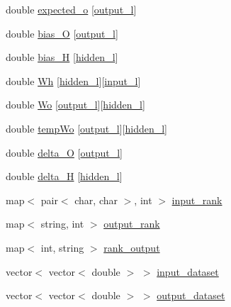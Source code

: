 \begin{DoxyCompactItemize}
\item 
double \hyperlink{a00003_a8d632cf69d2fcd076e473aba1ae74702}{expected\-\_\-o} \mbox{[}\hyperlink{a00008_a0a0ddfc9fb3bc3d90d175ed1f7bd54c5}{output\-\_\-l}\mbox{]}
\item 
double \hyperlink{a00003_a8f26363ac0ccda6f04df35e68164cd3a}{bias\-\_\-\-O} \mbox{[}\hyperlink{a00008_a0a0ddfc9fb3bc3d90d175ed1f7bd54c5}{output\-\_\-l}\mbox{]}
\item 
double \hyperlink{a00003_a38808438a02d406a7ab54c8bf825752a}{bias\-\_\-\-H} \mbox{[}\hyperlink{a00008_aa7fdf42e8c0a65ea15cb37a990708e36}{hidden\-\_\-l}\mbox{]}
\item 
double \hyperlink{a00003_a45dfc138d645e05eaeaa6ca6bb3df818}{Wh} \mbox{[}\hyperlink{a00008_aa7fdf42e8c0a65ea15cb37a990708e36}{hidden\-\_\-l}\mbox{]}\mbox{[}\hyperlink{a00008_a8dae3b2c955083e02ba56da92adbf25d}{input\-\_\-l}\mbox{]}
\item 
double \hyperlink{a00003_ad6730ce7c9fc3937299dd32473b12d1d}{Wo} \mbox{[}\hyperlink{a00008_a0a0ddfc9fb3bc3d90d175ed1f7bd54c5}{output\-\_\-l}\mbox{]}\mbox{[}\hyperlink{a00008_aa7fdf42e8c0a65ea15cb37a990708e36}{hidden\-\_\-l}\mbox{]}
\item 
double \hyperlink{a00003_a1cca3513af05c6dce603fdf332b36691}{temp\-Wo} \mbox{[}\hyperlink{a00008_a0a0ddfc9fb3bc3d90d175ed1f7bd54c5}{output\-\_\-l}\mbox{]}\mbox{[}\hyperlink{a00008_aa7fdf42e8c0a65ea15cb37a990708e36}{hidden\-\_\-l}\mbox{]}
\item 
double \hyperlink{a00003_ae5f829ba5e65ae91d5c4feda5f66e37a}{delta\-\_\-\-O} \mbox{[}\hyperlink{a00008_a0a0ddfc9fb3bc3d90d175ed1f7bd54c5}{output\-\_\-l}\mbox{]}
\item 
double \hyperlink{a00003_a51e5c2d2b53ba284c5b3791446c3b7d8}{delta\-\_\-\-H} \mbox{[}\hyperlink{a00008_aa7fdf42e8c0a65ea15cb37a990708e36}{hidden\-\_\-l}\mbox{]}
\item 
map$<$ pair$<$ char, char $>$, int $>$ \hyperlink{a00003_abb3f03e964a641cd94933a0f34292626}{input\-\_\-rank}
\item 
map$<$ string, int $>$ \hyperlink{a00003_af46a9de8ef619f93fb8c0231be79163c}{output\-\_\-rank}
\item 
map$<$ int, string $>$ \hyperlink{a00003_a8e34531b701290d16068e3685f3066a4}{rank\-\_\-output}
\item 
vector$<$ vector$<$ double $>$ $>$ \hyperlink{a00003_a81bab51b36643c5b10ba25d518c27ff3}{input\-\_\-dataset}
\item 
vector$<$ vector$<$ double $>$ $>$ \hyperlink{a00003_aa8441449f55f07c3da384d81608373b5}{output\-\_\-dataset}
\end{DoxyCompactItemize}
